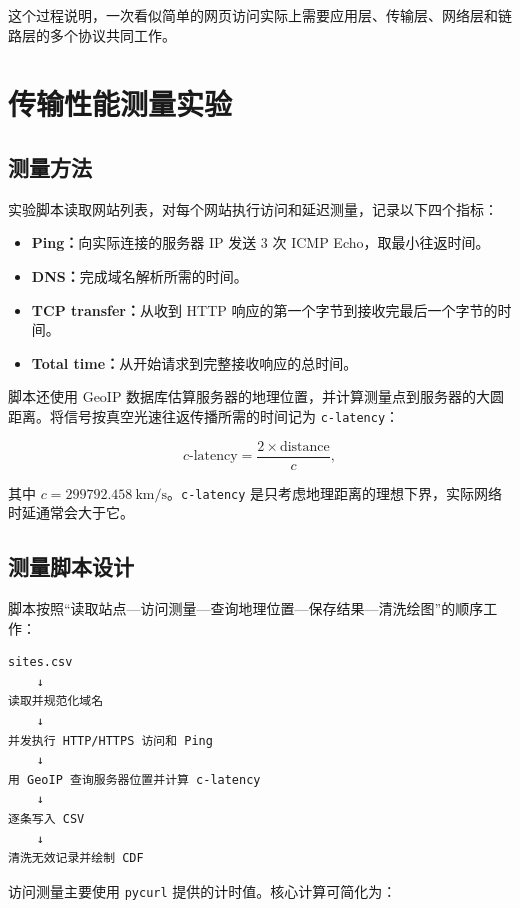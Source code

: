 \documentclass[UTF8,12pt,a4paper,fontset=fandol]{ctexart}
\begin{document}
这个过程说明，一次看似简单的网页访问实际上需要应用层、传输层、网络层和链路层的多个协议共同工作。

\section{传输性能测量实验}

\subsection{测量方法}

实验脚本读取网站列表，对每个网站执行访问和延迟测量，记录以下四个指标：

\begin{itemize}
  \item \textbf{Ping：}向实际连接的服务器 IP 发送 3 次 ICMP Echo，取最小往返时间。
  \item \textbf{DNS：}完成域名解析所需的时间。
  \item \textbf{TCP transfer：}从收到 HTTP 响应的第一个字节到接收完最后一个字节的时间。
  \item \textbf{Total time：}从开始请求到完整接收响应的总时间。
\end{itemize}

脚本还使用 GeoIP 数据库估算服务器的地理位置，并计算测量点到服务器的大圆距离。将信号按真空光速往返传播所需的时间记为 \texttt{c-latency}：

\begin{equation}
  c\text{-latency}=\frac{2\times \text{distance}}{c},
\end{equation}

其中 $c=299792.458\ \mathrm{km/s}$。\texttt{c-latency} 是只考虑地理距离的理想下界，实际网络时延通常会大于它。

\subsection{测量脚本设计}

脚本按照“读取站点---访问测量---查询地理位置---保存结果---清洗绘图”的顺序工作：

\begin{verbatim}
sites.csv
    ↓
读取并规范化域名
    ↓
并发执行 HTTP/HTTPS 访问和 Ping
    ↓
用 GeoIP 查询服务器位置并计算 c-latency
    ↓
逐条写入 CSV
    ↓
清洗无效记录并绘制 CDF
\end{verbatim}

访问测量主要使用 \texttt{pycurl} 提供的计时值。核心计算可简化为：
\end{document}
